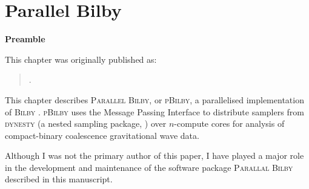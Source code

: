 \chapter[Parallel Bilby]{Parallel Bilby}
\label{ch.pbilby}

\textbf{Preamble}

This chapter was originally published as:

\begin{quote}
.
\end{quote}

This chapter describes \textsc{Parallel Bilby}, or \textsc{pBilby}, a parallelised implementation of \textsc{Bilby} \cite{bilby, pbilby}. 
\textsc{pBilby} uses the Message Passing Interface \cite{mpi} to distribute samplers from \textsc{dynesty} (a nested sampling package, \cite{dynesty}) over $n$-compute cores for analysis of compact-binary coalescence gravitational wave data.

Although I was not the primary author of this paper, I have played a major role in the development and maintenance of the software package \textsc{Parallal Bilby} described in this manuscript. 




